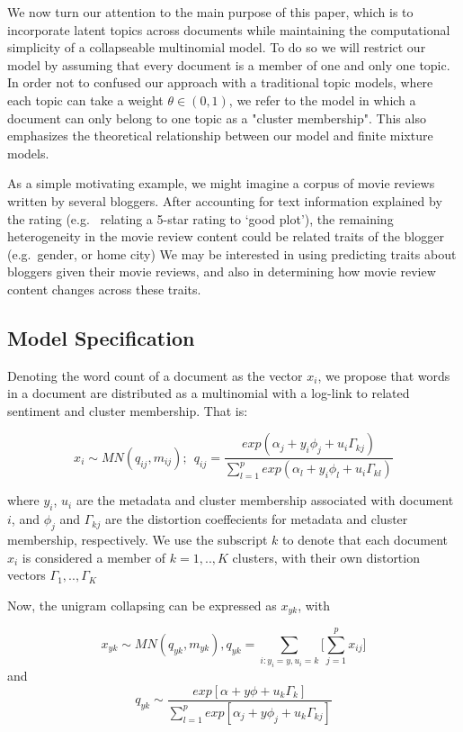 \documentclass[12pt]{article}
\begin{document}
We now turn our attention to the main purpose of this paper, which is to
incorporate latent topics across documents while maintaining the computational simplicity of a collapseable multinomial model. To do so we will restrict our model by assuming that every document is a member of one and only one topic. In order not to confused our approach with a traditional topic models, where each topic can take a weight $\theta \in (0,1)$, we refer to the model in which a document can only belong to one topic as a "cluster membership". This also emphasizes the theoretical relationship between our model and finite mixture models. 

As a simple motivating example, we might imagine a corpus of
movie reviews written by several bloggers. After accounting for text
information explained by the rating (e.g. ~relating a 5-star rating to
`good plot'), the remaining heterogeneity in the movie review
content could be related traits of the blogger (e.g.~gender, or home
city) We may be interested in using predicting traits about bloggers
given their movie reviews, and also in determining how movie review
content changes across these traits.




\subsection{Model Specification}\label{model-specification}

Denoting the word count of a document as the vector $x_i$, we propose
that words in a document are distributed as a multinomial with a
log-link to related sentiment and cluster membership. That is:

\begin{equation}
 x_{i} \sim MN(q_{ij},m_{ij})    ; ~~  q_{ij} = \frac{exp(\alpha_j + y_i \phi_j + u_i \Gamma_{kj})}{\sum_{l=1}^{p}{exp(\alpha_l+ y_i \phi_l + u_i \Gamma_{kl})}}
\end{equation} 


where $y_i$, $u_i$ are the metadata and cluster membership associated
with document $i$, and $\phi_j$ and $\Gamma_{kj}$ are the distortion
coeffecients for metadata and cluster membership, respectively. We use
the subscript $k$ to denote that each document $x_i$ is considered a
member of $k = 1,..,K$ clusters, with their own distortion vectors
$\Gamma_1,..,\Gamma_K$

Now, the unigram collapsing can be expressed as $x_{yk}$, with

\begin{equation}
 x_{yk} \sim MN(q_{yk},m_{yk}), q_{yk} = \sum\limits_{i: y_i = y, u_i = k} \big[\sum_{j = 1}^{p} {x_{ij}} \big]
\end{equation}
and 
\begin{equation}
q_{yk} \sim \frac{exp[\alpha + y \phi  + u_k \Gamma_{k}]}{\sum_{l=1}^{p} exp[\alpha_j + y \phi_j+ u_k \Gamma_{kj} ]}
\end{equation}
\end{document}
